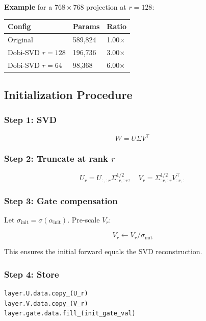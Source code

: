 \textbf{Example} for a $768 \times 768$ projection at $r = 128$:

\begin{table}[H]
\centering
\small
\begin{tabular}{lll}
\toprule
\textbf{Config} & \textbf{Params} & \textbf{Ratio} \\
\midrule
Original & 589,824 & 1.00$\times$ \\
Dobi-SVD $r=128$ & 196,736 & 3.00$\times$ \\
Dobi-SVD $r=64$ & 98,368 & 6.00$\times$ \\
\bottomrule
\end{tabular}
\end{table}

\subsection{Initialization Procedure}

\subsubsection{Step 1: SVD}

\[
W = U \Sigma V^\top
\tag{4.2}
\]

\subsubsection{Step 2: Truncate at rank $r$}

\[
U_r = U_{:, :r} \Sigma_{:r, :r}^{1/2}, \quad
V_r = \Sigma_{:r, :r}^{1/2} V_{:r, :}^\top
\tag{4.3}
\]

\subsubsection{Step 3: Gate compensation}

Let $\sigma_\text{init} = \sigma(\alpha_\text{init})$. Pre-scale $V_r$:

\[
V_r \leftarrow V_r / \sigma_\text{init}
\tag{4.4}
\]

This ensures the initial forward equals the SVD reconstruction.

\subsubsection{Step 4: Store}

\begin{lstlisting}
layer.U.data.copy_(U_r)
layer.V.data.copy_(V_r)
layer.gate.data.fill_(init_gate_val)
\end{lstlisting}


